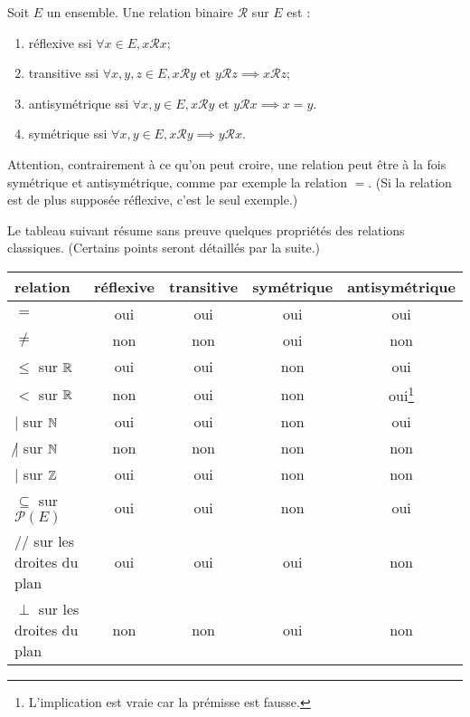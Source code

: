 \begin{definition}
Soit $E$ un ensemble. Une relation binaire ${\mathcal R}$ sur $E$ est : 
\begin{enumerate}
\item réflexive ssi $\forall x\in E, x{\mathcal R}x$;
\item transitive ssi $\forall x, y, z\in E, x\mathcal Ry \text{ et } y{\mathcal R}z \implies x{\mathcal R}z$;
\item antisymétrique ssi $\forall x, y \in E, x{\mathcal R}y\text{ et } y{\mathcal R}x \implies x=y$.
\item symétrique ssi $\forall x, y\in E, x\mathcal R y \implies y\mathcal R x$.
\end{enumerate}
\end{definition}

Attention, contrairement à ce qu'on peut croire, une relation peut être à la fois symétrique et antisymétrique, comme par exemple la relation $=$. (Si la relation est de plus supposée réflexive, c'est le seul exemple.)

Le tableau suivant résume sans preuve quelques propriétés des relations classiques. (Certains points seront détaillés par la suite.)\\

\begin{tabular}{|l|c|c|c|c|}\hline
relation & réflexive & transitive & symétrique & antisymétrique \\ \hline
$=$ & oui & oui & oui & oui \\ \hline
$\neq$ & non & non & oui & non \\ \hline
$\leq$ sur $\mathbb{R}$ & oui & oui & non & oui \\ \hline
$<$ sur $\mathbb{R}$ & non & oui & non & oui\footnote{L'implication est vraie car la prémisse est fausse.} \\ \hline
$|$ sur $\mathbb{N}$ & oui & oui & non & oui \\ \hline
$\not |$ sur $\mathbb{N}$ & non & non & non & non \\ \hline
$|$ sur $\mathbb{Z}$ & oui & oui & non & non \\ \hline
$\subseteq$ sur $\mathcal P(E)$ & oui & oui & non & oui \\ \hline
$//$ sur les droites du plan & oui & oui & oui & non \\ \hline
$\perp$ sur les droites du plan & non & non & oui & non \\ \hline
\end{tabular}

